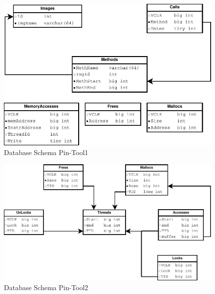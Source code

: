 \begin{figure}
  \includegraphics[width=\columnwidth]{database_schema1}
  \caption{Database Schema Pin-Tool1}
  \label{pic:db_schema1}
\end{figure}


\begin{figure}
  \includegraphics[width=\columnwidth]{database_schema2}
  \caption{Database Schema Pin-Tool2}
  \label{pic:db_schema2}
\end{figure}
